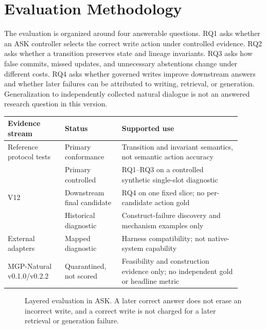 \section{Evaluation Methodology}
\label{sec:setup}

The evaluation is organized around four answerable questions. RQ1 asks whether
an ASK controller selects the correct write action under controlled evidence.
RQ2 asks whether a transition preserves state and lineage invariants. RQ3 asks
how false commits, missed updates, and unnecessary abstentions change under
different costs. RQ4 asks whether governed writes improve downstream answers
and whether later failures can be attributed to writing, retrieval, or
generation. Generalization to independently collected natural dialogue is not
an answered research question in this version.

\begin{center}
\small
\begin{tabular}{@{}p{0.22\linewidth}p{0.22\linewidth}p{0.46\linewidth}@{}}
\toprule
Evidence stream & Status & Supported use \\
\midrule
Reference protocol tests & Primary conformance & Transition and invariant semantics, not semantic action accuracy \\
\mgpc{} & Primary controlled & RQ1--RQ3 on a controlled synthetic single-slot diagnostic \\
\lme{} V12 & Downstream final candidate & RQ4 on one fixed slice; no per-candidate action gold \\
\mgp{} & Historical diagnostic & Construct-failure discovery and mechanism examples only \\
External adapters & Mapped diagnostic & Harness compatibility; not native-system capability \\
MGP-Natural v0.1.0/v0.2.2 & Quarantined, not scored & Feasibility and construction evidence only; no independent gold or headline metric \\
\bottomrule
\end{tabular}
\end{center}

\begin{figure}[!h]
\centering
{}
\caption{Layered evaluation in ASK. A later correct answer does not erase an
incorrect write, and a correct write is not charged for a later retrieval or
generation failure.}
\label{fig:evaluation-layers}
\end{figure}

